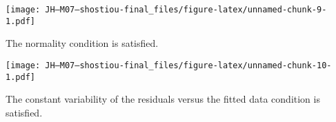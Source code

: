 \documentclass[
]{article}
\newenvironment{Shaded}{\begin{snugshade}}{\end{snugshade}}
\newcommand{\CommentTok}[1]{\textcolor[rgb]{0.56,0.35,0.01}{\textit{#1}}}
\newcommand{\DataTypeTok}[1]{\textcolor[rgb]{0.13,0.29,0.53}{#1}}
\newcommand{\KeywordTok}[1]{\textcolor[rgb]{0.13,0.29,0.53}{\textbf{#1}}}
\newcommand{\NormalTok}[1]{#1}
\newcommand{\OperatorTok}[1]{\textcolor[rgb]{0.81,0.36,0.00}{\textbf{#1}}}
\newcommand{\StringTok}[1]{\textcolor[rgb]{0.31,0.60,0.02}{#1}}
\begin{document}
\texttt{[image: JH---M07---shostiou-final\_files/figure-latex/unnamed-chunk-9-1.pdf]}

The normality condition is satisfied.\\

\begin{Shaded}
\end{Shaded}

\texttt{[image: JH---M07---shostiou-final\_files/figure-latex/unnamed-chunk-10-1.pdf]}

The constant variability of the residuals versus the fitted data
condition is satisfied.
\end{document}
